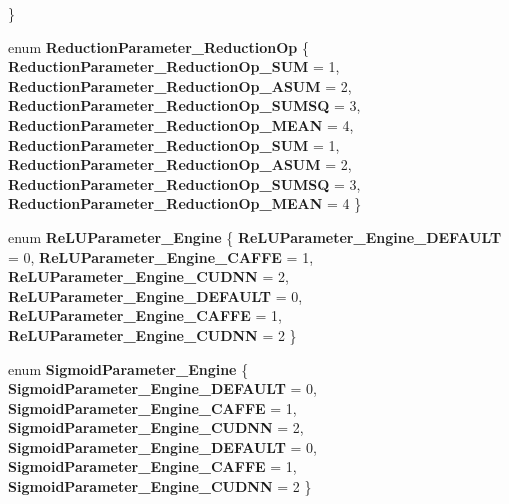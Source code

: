 \begin{DoxyCompactItemize}
 \}
\item 
\mbox{\label{namespacecaffe_a1560a2b6065051352fb8f3db1f02243e}} 
enum {\bfseries Reduction\+Parameter\+\_\+\+Reduction\+Op} \{ \newline
{\bfseries Reduction\+Parameter\+\_\+\+Reduction\+Op\+\_\+\+S\+UM} = 1, 
{\bfseries Reduction\+Parameter\+\_\+\+Reduction\+Op\+\_\+\+A\+S\+UM} = 2, 
{\bfseries Reduction\+Parameter\+\_\+\+Reduction\+Op\+\_\+\+S\+U\+M\+SQ} = 3, 
{\bfseries Reduction\+Parameter\+\_\+\+Reduction\+Op\+\_\+\+M\+E\+AN} = 4, 
\newline
{\bfseries Reduction\+Parameter\+\_\+\+Reduction\+Op\+\_\+\+S\+UM} = 1, 
{\bfseries Reduction\+Parameter\+\_\+\+Reduction\+Op\+\_\+\+A\+S\+UM} = 2, 
{\bfseries Reduction\+Parameter\+\_\+\+Reduction\+Op\+\_\+\+S\+U\+M\+SQ} = 3, 
{\bfseries Reduction\+Parameter\+\_\+\+Reduction\+Op\+\_\+\+M\+E\+AN} = 4
 \}
\item 
\mbox{\label{namespacecaffe_afcc40053b14575a29d9425fcfde3514b}} 
enum {\bfseries Re\+L\+U\+Parameter\+\_\+\+Engine} \{ \newline
{\bfseries Re\+L\+U\+Parameter\+\_\+\+Engine\+\_\+\+D\+E\+F\+A\+U\+LT} = 0, 
{\bfseries Re\+L\+U\+Parameter\+\_\+\+Engine\+\_\+\+C\+A\+F\+FE} = 1, 
{\bfseries Re\+L\+U\+Parameter\+\_\+\+Engine\+\_\+\+C\+U\+D\+NN} = 2, 
{\bfseries Re\+L\+U\+Parameter\+\_\+\+Engine\+\_\+\+D\+E\+F\+A\+U\+LT} = 0, 
\newline
{\bfseries Re\+L\+U\+Parameter\+\_\+\+Engine\+\_\+\+C\+A\+F\+FE} = 1, 
{\bfseries Re\+L\+U\+Parameter\+\_\+\+Engine\+\_\+\+C\+U\+D\+NN} = 2
 \}
\item 
\mbox{\label{namespacecaffe_ac4c918387f1912b2fec8c7790ce83227}} 
enum {\bfseries Sigmoid\+Parameter\+\_\+\+Engine} \{ \newline
{\bfseries Sigmoid\+Parameter\+\_\+\+Engine\+\_\+\+D\+E\+F\+A\+U\+LT} = 0, 
{\bfseries Sigmoid\+Parameter\+\_\+\+Engine\+\_\+\+C\+A\+F\+FE} = 1, 
{\bfseries Sigmoid\+Parameter\+\_\+\+Engine\+\_\+\+C\+U\+D\+NN} = 2, 
{\bfseries Sigmoid\+Parameter\+\_\+\+Engine\+\_\+\+D\+E\+F\+A\+U\+LT} = 0, 
\newline
{\bfseries Sigmoid\+Parameter\+\_\+\+Engine\+\_\+\+C\+A\+F\+FE} = 1, 
{\bfseries Sigmoid\+Parameter\+\_\+\+Engine\+\_\+\+C\+U\+D\+NN} = 2
 \}
\item 
\mbox{\label{namespacecaffe_a3f6422b4fe63e2334d357cbbf9f4642a}} 

\end{DoxyCompactItemize}
